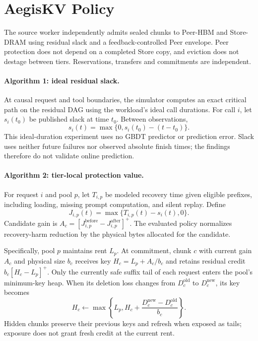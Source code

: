 \section{AegisKV Policy}
\label{sec:policy}

The source worker independently admits sealed chunks to Peer-HBM and
Store-DRAM using residual slack and a feedback-controlled Peer envelope.
Peer protection does not depend on a completed Store copy, and eviction
does not destage between tiers. Reservations, transfers and commitments
are independent.

\paragraph{Algorithm 1: ideal residual slack.}
At causal request and tool boundaries, the simulator computes an exact critical
path on the residual DAG using the workload's ideal call durations. For call
$i$, let $s_i(t_0)$ be published slack at time $t_0$. Between observations,
\begin{equation}
  s_i(t)=\max\{0,s_i(t_0)-(t-t_0)\}.
\end{equation}
This ideal-duration experiment uses no GBDT predictor or prediction error.
Slack uses neither future failures nor observed absolute finish times;
the findings therefore do not validate online prediction.

\paragraph{Algorithm 2: tier-local protection value.}
For request $i$ and pool $p$, let $T_{i,p}$ be modeled recovery time given
eligible prefixes, including loading, missing prompt computation, and silent
replay. Define
\begin{equation}
  J_{i,p}(t)=\max\{T_{i,p}(t)-s_i(t),0\}.
\end{equation}
Candidate gain is
$A_c=[J_{i,p}^{\mathrm{before}}-J_{i,p}^{\mathrm{after}}]^+$.
The evaluated policy normalizes recovery-harm reduction by the physical
bytes allocated for the candidate.

Specifically, pool $p$ maintains rent $L_p$. At commitment, chunk $c$ with
current gain $A_c$ and physical size $b_c$ receives key
$H_c=L_p+A_c/b_c$ and retains residual credit
$b_c[H_c-L_p]^+$. Only the currently safe suffix tail of each request enters
the pool's minimum-key heap. When its deletion loss changes from
$D_c^{\mathrm{old}}$ to $D_c^{\mathrm{new}}$, its key becomes
\begin{equation}
 H_c\leftarrow\max\!\left\{L_p,
 H_c+\frac{D_c^{\mathrm{new}}-D_c^{\mathrm{old}}}{b_c}\right\}.
\end{equation}
Hidden chunks preserve their previous keys and refresh when exposed as tails;
exposure does not grant fresh credit at the current rent.

